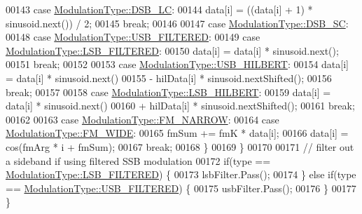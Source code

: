 \begin{DoxyCode}
00143                 \textcolor{keywordflow}{case} \hyperlink{namespaceradio_a46fb7299001138f28b7f69975c58399eaf180dafbc98f54c6382ae29243cec902}{ModulationType::DSB\_LC}:
00144                     data[i] = ((data[i] + 1) * sinusoid.next()) / 2;
00145                     \textcolor{keywordflow}{break};
00146 
00147                 \textcolor{keywordflow}{case} \hyperlink{namespaceradio_a46fb7299001138f28b7f69975c58399ea92c257208ae8b0c6d88c80abcf15ec31}{ModulationType::DSB\_SC}:
00148                 \textcolor{keywordflow}{case} \hyperlink{namespaceradio_a46fb7299001138f28b7f69975c58399ea9d8eca0470206cddb0dd0297717eb876}{ModulationType::USB\_FILTERED}:
00149                 \textcolor{keywordflow}{case} \hyperlink{namespaceradio_a46fb7299001138f28b7f69975c58399eaa6fd9ffa81c9d5e4a255b0c3b2336bd8}{ModulationType::LSB\_FILTERED}:
00150                     data[i] = data[i] * sinusoid.next();
00151                     \textcolor{keywordflow}{break};
00152 
00153                 \textcolor{keywordflow}{case} \hyperlink{namespaceradio_a46fb7299001138f28b7f69975c58399ea1b14284e455bf5c311de662665312d13}{ModulationType::USB\_HILBERT}:
00154                     data[i] = data[i] * sinusoid.next()
00155                         - hilData[i] * sinusoid.nextShifted();
00156                     \textcolor{keywordflow}{break};
00157 
00158                 \textcolor{keywordflow}{case} \hyperlink{namespaceradio_a46fb7299001138f28b7f69975c58399ea18f970daa5b5a8f72cbd45f7b49a6b6a}{ModulationType::LSB\_HILBERT}:
00159                     data[i] = data[i] * sinusoid.next()
00160                         + hilData[i] * sinusoid.nextShifted();
00161                     \textcolor{keywordflow}{break};
00162 
00163                 \textcolor{keywordflow}{case} \hyperlink{namespaceradio_a46fb7299001138f28b7f69975c58399ea7b4b1e7876b8d9de5b77b9264fbe556a}{ModulationType::FM\_NARROW}:
00164                 \textcolor{keywordflow}{case} \hyperlink{namespaceradio_a46fb7299001138f28b7f69975c58399eafabee3b32b363b14950cb5f5b61e998c}{ModulationType::FM\_WIDE}:
00165                     fmSum += fmK * data[i];
00166                     data[i] = cos(fmArg * i + fmSum);
00167                     \textcolor{keywordflow}{break};
00168             \}
00169         \}
00170 
00171         \textcolor{comment}{// filter out a sideband if using filtered SSB modulation}
00172         \textcolor{keywordflow}{if}(type == \hyperlink{namespaceradio_a46fb7299001138f28b7f69975c58399eaa6fd9ffa81c9d5e4a255b0c3b2336bd8}{ModulationType::LSB\_FILTERED}) \{
00173             lsbFilter.Pass();
00174         \} \textcolor{keywordflow}{else} \textcolor{keywordflow}{if}(type == \hyperlink{namespaceradio_a46fb7299001138f28b7f69975c58399ea9d8eca0470206cddb0dd0297717eb876}{ModulationType::USB\_FILTERED}) \{
00175             usbFilter.Pass();
00176         \}
00177     \}
\end{DoxyCode}


